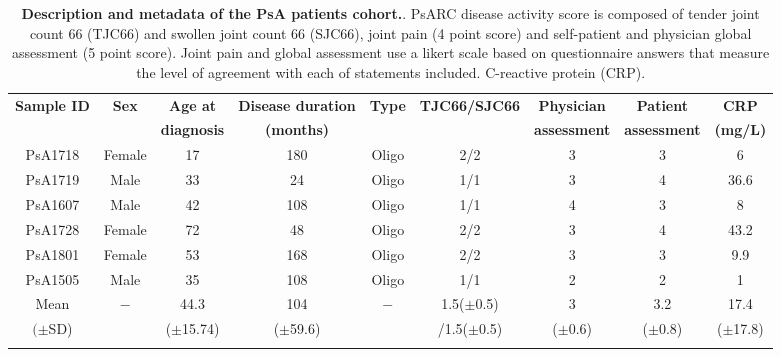 %
\begin{landscape}
\begin{center}
\renewcommand{\arraystretch}{0.8}
\begin{longtable}[ht]{c c c c c c c c c}
\caption[Description and metadata of the PsA patients cohort.]{\textbf{Description and metadata of the PsA patients cohort.}. PsARC disease activity score is composed of tender joint count 66 (TJC66) and swollen joint count 66 (SJC66), joint pain (4 point score) and self-patient and physician global assessment (5 point score). Joint pain and global assessment use a likert scale based on questionnaire answers that measure the level of agreement with each of statements included. C-reactive protein (CRP).}
\label{tab:PSA_cohort_metadata} \\
\toprule
\textbf{ Sample ID} & \textbf{Sex} & \textbf{Age at} & \textbf{Disease duration} & \textbf{Type} &\textbf{TJC66/SJC66}  & \textbf{Physician } & \textbf{Patient} & \textbf{CRP} \\
                   &               & \textbf{diagnosis} & \textbf{(months)}      &               &                      & \textbf{assessment} & \textbf{assessment}  & \textbf{(mg/L)} \\
\midrule
\midrule
PsA1718 & Female & 17 & 180 & Oligo  & 2/2 & 3 & 3 & 6 \\
PsA1719	& Male &	33 & 24	 & Oligo &	1/1 &	3 & 4 & 36.6 \\           
PsA1607 &	Male & 42 & 108 &	Oligo &	1/1	& 4 & 3 & 8 \\
PsA1728	& Female & 72	& 48 & Oligo & 2/2 & 3 & 4 & 43.2 \\
PsA1801	& Female & 53 & 168 & Oligo & 2/2 &	3 & 3 & 9.9 \\
PsA1505 & Male & 35 &	108 & Oligo & 1/1 & 2 & 2 & 1 \\	
\midrule
Mean		  & $-$	&	44.3         & 104         & $-$ & 1.5($\pm$0.5)  & 3         & 3.2        & 17.4       \\	
$(\pm$SD)	&   	&	($\pm$15.74) & ($\pm$59.6) &     & /1.5($\pm$0.5) &($\pm$0.6) & ($\pm$0.8) & ($\pm$17.8) \\																			
\bottomrule
\medskip
\end{longtable}
\end{center}
\end{landscape}



